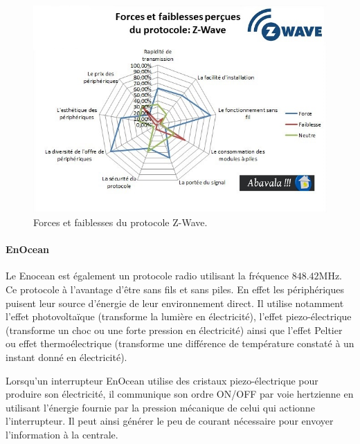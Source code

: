 \documentclass[a4paper,10pt]{article}
\begin{document}
\begin{figure}[H]
\centering\includegraphics[scale=0.7]{forces-protocole-zwave.jpg}
\caption{Forces et faiblesses du protocole Z-Wave.}
\end{figure}

\paragraph{EnOcean}
Le Enocean est également un protocole radio utilisant la fréquence $848.42$MHz. Ce protocole à l'avantage d'être sans fils et sans piles. En effet les périphériques puisent leur source d'énergie de leur environnement direct. Il utilise notamment l'effet photovoltaïque (transforme la lumière en électricité), l'effet piezo-électrique (transforme un choc ou une forte pression en électricité) ainsi que l’effet Peltier ou effet thermoélectrique (transforme une différence de température constaté à un instant donné en électricité).

Lorsqu’un interrupteur EnOcean utilise des cristaux piezo-électrique pour produire son électricité, il communique son ordre ON/OFF par voie hertzienne en utilisant l’énergie fournie par la pression mécanique de celui qui actionne l’interrupteur. Il peut ainsi générer le peu de courant nécessaire pour envoyer l’information à la centrale.
\end{document}
